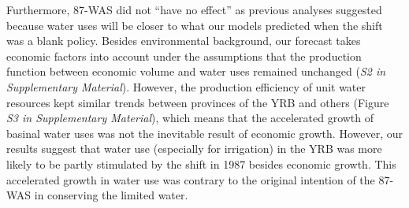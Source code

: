 Furthermore, 87-WAS did not ``have no effect'' as previous analyses suggested because water uses will be closer to what our models predicted when the shift was a blank policy.
Besides environmental background, our forecast takes economic factors into account under the assumptions that the production function between economic volume and water uses remained unchanged (\textit{S2 in Supplementary Material}).
However, the production efficiency of unit water resources kept similar trends between provinces of the YRB and others (Figure \textit{S3 in Supplementary Material}), which means that the accelerated growth of basinal water uses was not the inevitable result of economic growth.
However, our results suggest that water use (especially for irrigation) in the YRB was more likely to be partly stimulated by the shift in 1987 besides economic growth.
This accelerated growth in water use was contrary to the original intention of the 87-WAS in conserving the limited water.

